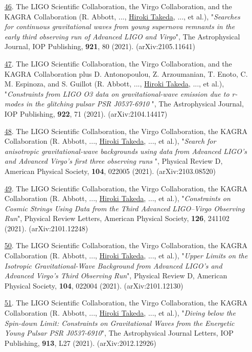 \documentclass[uplatex, 12pt]{article}
\begin{document}
\begin{enumerate}
\item[\uline{46}.] The LIGO Scientific Collaboration, the Virgo Collaboration, and the KAGRA Collaboration (R. Abbott, ..., \uline{Hiroki Takeda}, ..., et al.), "\emph{Searches for continuous gravitational waves from young supernova remnants in the early third observing run of Advanced LIGO and Virgo}", The Astrophysical Journal, IOP Publishing, {\bf 921}, 80 (2021). (arXiv:2105.11641)\\

\item[\uline{47}.] The LIGO Scientific Collaboration, the Virgo Collaboration, and the KAGRA Collaboration plus D. Antonopoulou, Z. Arzoumanian, T. Enoto, C. M. Espinoza, and S. Guillot (R. Abbott, ..., \uline{Hiroki Takeda}, ..., et al.), "\emph{Constraints from LIGO O3 data on gravitational-wave emission due to r-modes in the glitching pulsar PSR J0537-6910 }", The Astrophysical Journal, IOP Publishing, {\bf 922}, 71 (2021). (arXiv:2104.14417)\\

\item[\uline{48}.] The LIGO Scientific Collaboration, the Virgo Collaboration, the KAGRA Collaboration (R. Abbott, ..., \uline{Hiroki Takeda}, ..., et al.), "\emph{Search for anisotropic gravitational-wave backgrounds using data from Advanced LIGO's and Advanced Virgo's first three observing runs }", Physical Review D, American Physical Society, {\bf 104}, 022005 (2021). (arXiv:2103.08520)\\

\item[\uline{49}.] The LIGO Scientific Collaboration, the Virgo Collaboration, the KAGRA Collaboration (R. Abbott, ..., \uline{Hiroki Takeda}, ..., et al.), "\emph{Constraints on Cosmic Strings Using Data from the Third Advanced LIGO–Virgo Observing Run}", Physical Review Letters, American Physical Society, {\bf 126}, 241102 (2021). (arXiv:2101.12248)\\

\item[\uline{50}.] The LIGO Scientific Collaboration, the Virgo Collaboration, the KAGRA Collaboration (R. Abbott, ..., \uline{Hiroki Takeda}, ..., et al.), "\emph{Upper Limits on the Isotropic Gravitational-Wave Background from Advanced LIGO's and Advanced Virgo's Third Observing Run}", Physical Review D, American Physical Society, {\bf 104}, 022004 (2021). (arXiv:2101.12130)\\

\item[\uline{51}.] The LIGO Scientific Collaboration, the Virgo Collaboration, the KAGRA Collaboration (R. Abbott, ..., \uline{Hiroki Takeda}, ..., et al.), "\emph{Diving below the Spin-down Limit: Constraints on Gravitational Waves from the Energetic Young Pulsar PSR J0537-6910}", The Astrophysical Journal Letters, IOP Publishing, {\bf 913}, L27 (2021). (arXiv:2012.12926)\\


\end{enumerate}
\end{document}
